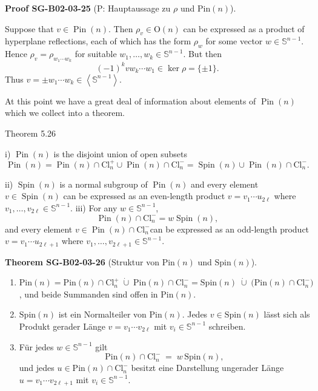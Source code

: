 \documentclass[10pt, letterpaper]{article}
\newcommand{\Cl}{\mathrm{Cl}}
\newcommand{\Spin}{\mathrm{Spin}}
\newcommand{\Pin}{\mathrm{Pin}}
\newcommand{\CustomHeading}[3]{%
  \par\medskip\noindent%
  \textbf{#1 #2} \textnormal{(#3)}.\enskip%
}
\newenvironment{THEO}[2]{\begin{unitbox}\CustomHeading{Theorem}{#1}{#2}}{\end{unitbox}}
\newenvironment{PROOF}[2]{\begin{unitbox}\CustomHeading{Proof}{#1}{#2}}{\end{unitbox}}
\begin{document}
\begin{PROOF}{SG-B02-03-25}{P: Hauptaussage zu \(\rho\) und \(\Pin(n)\)}
Suppose that $v \in \operatorname{Pin}(n)$. Then $\rho_{v} \in \mathrm{O}(n)$ can be expressed as a product of hyperplane reflections, each of which has the form $\rho_{w}$ for some vector $w \in \mathbb{S}^{n-1}$. Hence $\rho_{v}=\rho_{w_{1} \cdots w_{k}}$ for suitable $w_{1}, \ldots, w_{k} \in \mathbb{S}^{n-1}$. But then
$$
(-1)^{k} v w_{k} \cdots w_{1} \in \operatorname{ker} \rho=\{ \pm 1\} .
$$
Thus $v= \pm w_{1} \cdots w_{k} \in\left\langle\mathbb{S}^{n-1}\right\rangle$.
\end{PROOF}



At this point we have a great deal of information about elements of $\operatorname{Pin}(n)$ which we collect into a theorem.



Theorem 5.26

i) $\operatorname{Pin}(n)$ is the disjoint union of open subsets
$$
\operatorname{Pin}(n)=\operatorname{Pin}(n) \cap \mathrm{Cl}_{n}^{+} \cup \operatorname{Pin}(n) \cap \mathrm{Cl}_{n}^{-}=\operatorname{Spin}(n) \cup \operatorname{Pin}(n) \cap \mathrm{Cl}_{n}^{-} .
$$

ii) $\operatorname{Spin}(n)$ is a normal subgroup of $\operatorname{Pin}(n)$ and every element $v \in \operatorname{Spin}(n)$ can be expressed as an even-length product $v=v_{1} \cdots u_{2 \ell}$ where $v_{1}, \ldots, v_{2 \ell} \in \mathbb{S}^{n-1}$. iii) For any $w \in \mathbb{S}^{n-1}$,
$$
\operatorname{Pin}(n) \cap \mathrm{Cl}_{n}^{-}=w \operatorname{Spin}(n),
$$
and every element $v \in \operatorname{Pin}(n) \cap \mathrm{Cl}_{n}^{-}$can be expressed as an odd-length product $v=v_{1} \cdots u_{2 \ell+1}$ where $v_{1}, \ldots, v_{2 \ell+1} \in \mathbb{S}^{n-1}$.



\begin{THEO}{SG-B02-03-26}{Struktur von \(\Pin(n)\) und \(\Spin(n)\)}
\begin{enumerate}[label=\textnormal{(\roman*)}]
\item \(\displaystyle \Pin(n)=\Pin(n)\cap\Cl_n^{+}\;\dot\cup\;\Pin(n)\cap\Cl_n^{-}
=\Spin(n)\;\dot\cup\;\bigl(\Pin(n)\cap\Cl_n^{-}\bigr)\), und beide Summanden sind offen in \(\Pin(n)\).
\item \(\Spin(n)\) ist ein Normalteiler von \(\Pin(n)\). Jedes \(v\in\Spin(n)\) lässt sich als Produkt gerader Länge
\(v=v_1\cdots v_{2\ell}\) mit \(v_i\in\mathbb S^{n-1}\) schreiben.
\item Für jedes \(w\in\mathbb S^{n-1}\) gilt
\[
\Pin(n)\cap\Cl_n^{-}\;=\;w\,\Spin(n),
\]
und jedes \(u\in\Pin(n)\cap\Cl_n^{-}\) besitzt eine Darstellung ungerader Länge
\(u=v_1\cdots v_{2\ell+1}\) mit \(v_i\in\mathbb S^{n-1}\).
\end{enumerate}
\end{THEO}
\end{document}
